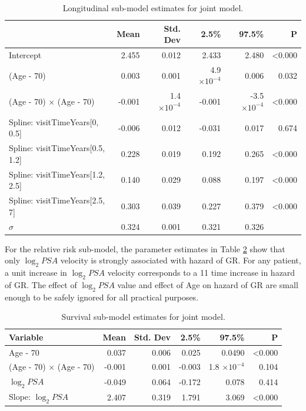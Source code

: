 \begin{table}[!htb]
\centering
\caption{Longitudinal sub-model estimates for joint model.}
\label{tab : PSA_long}
\captionsetup{justification=centering}
\begin{tabular}{@{}lrrrrr@{}}
\toprule
                                     & Mean   & Std. Dev           & 2.5\%               & 97.5\%              & P              \\ \midrule
Intercept                            &  2.455 & 0.012 & 2.433 & 2.480               & \textless0.000 \\
(Age - 70)                           & 0.003 & 0.001 & 4.9 $\times 10^{-4}$ & 0.006 & 0.032          \\
(Age - 70) $\times$ (Age - 70)       & -0.001 & 1.4 $\times 10^{-4}$ & -0.001 & -3.5 $\times 10^{-4}$ & \textless0.000 \\
Spline: visitTimeYears{[}0, 0.5{]}   & -0.006 & 0.012 & -0.031 & 0.017 & 0.674 \\
Spline: visitTimeYears{[}0.5, 1.2{]} & 0.228 & 0.019 & 0.192 & 0.265               & \textless0.000 \\
Spline: visitTimeYears{[}1.2, 2.5{]} & 0.140 & 0.029 & 0.088 & 0.197               & \textless0.000 \\
Spline: visitTimeYears{[}2.5, 7{]}   & 0.303 & 0.039 & 0.227 & 0.379               & \textless0.000 \\
$\sigma$                               & 0.324 & 0.001 & 0.321 & 0.326              &  \\ \bottomrule
\end{tabular}
\end{table}

For the relative risk sub-model, the parameter estimates in Table \ref{tab : PSA_survival} show that only $\log_2 PSA$ velocity is strongly associated with hazard of GR. For any patient, a unit increase in $\log_2 PSA$ velocity corresponds to a 11 time increase in hazard of GR. The effect of $\log_2 PSA$ value and effect of Age on hazard of GR are small enough to be safely ignored for all practical purposes.

\begin{table}[!htb]
\centering
\caption{Survival sub-model estimates for joint model.}
\captionsetup{justification=centering}
\label{tab : PSA_survival}
\begin{tabular}{@{}lrrrrr@{}}
\toprule
Variable                      & Mean   & Std. Dev & 2.5\%  & 97.5\%                 & P              \\ \midrule
Age - 70                      & 0.037 & 0.006 & 0.025 & 0.0490                  & \textless0.000 \\
(Age - 70) $\times$ (Age - 70) & -0.001 & 0.001 & -0.003 & 1.8 $\times 10^{-4}$ & 0.104          \\
$\log_2 PSA$                  & -0.049 & 0.064 & -0.172 & 0.078 & 0.414         \\
Slope: $\log_2 PSA$           & 2.407 & 0.319 & 1.791 & 3.069 & \textless0.000 \\ \bottomrule
\end{tabular}
\end{table}

